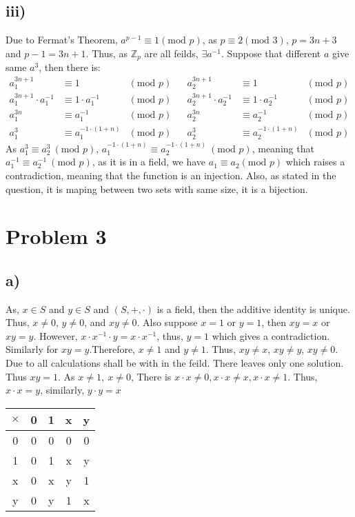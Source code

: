 \documentclass{article}
\begin{document}
\subsection*{iii)}
Due to Fermat's Theorem, \(a^{p-1}\equiv 1 (\text{mod }p)\), as \(p\equiv 2 (\text{mod }3)\), \(p=3n+3\) and \(p-1=3n+1\).
Thus, as \(\mathbb{Z}_p\) are all feilds, \(\exists a^{-1}\). Suppose that different \(a\) give same \(a^3\), then there is:
\begin{align*}
    a_1^{3n+1}&\equiv 1 &(\text{mod }p)&&a_2^{3n+1}&\equiv 1 &(\text{mod }p)\\
    a_1^{3n+1}\cdot a_1^{-1}&\equiv 1\cdot a_1^{-1} &(\text{mod }p)&&a_2^{3n+1}\cdot a_2^{-1}&\equiv 1\cdot a_2^{-1} &(\text{mod }p)\\
    a_1^{3n}&\equiv a_1^{-1} &(\text{mod }p)&&a_2^{3n}&\equiv a_2^{-1} &(\text{mod }p)\\
    a_1^{3}&\equiv a_1^{-1\cdot(1+n)} &(\text{mod }p)&&a_2^{3}&\equiv a_2^{-1\cdot(1+n)} &(\text{mod }p)
\end{align*}
As \(a^3_1\equiv a_2^3 \ (\text{mod }p)\), \(a_1^{-1\cdot(1+n)}\equiv a_2^{-1\cdot(1+n)}\ (\text{mod }p)\), meaning that
\\ \(a_1^{-1}\equiv a_2^{-1}\ (\text{mod }p)\), as it is in a field, we have \(a_1\equiv a_2 (\text{mod }p)\) which raises a contradiction, meaning that the 
function is an injection. Also, as stated in the question, it is maping between two sets with same size, it is a bijection.
\section*{Problem 3}
\subsection*{a)}
As, \(x\in S\) and \(y \in S\) and \((S,+,\cdot)\) is a field, then the additive identity is unique.
Thus, \(x\neq 0\), \(y\neq 0\), and \(xy\neq 0\). Also suppose \(x=1\) or \(y=1\), then \(xy=x\) or \(xy=y\).
However, \(x\cdot x^{-1}\cdot y = x\cdot x^{-1}\), thus, \(y=1\) which gives a contradiction. Similarly for \(xy=y\).Therefore, \(x\neq1\) and \(y\neq 1\).
Thus, \(xy\neq x\), \(xy\neq y\), \(xy\neq 0\). Due to all calculations shall be with in the feild. There leaves only one solution. Thus
\(xy = 1\). As \(x\neq1,\ x\neq 0\), There is \(x\cdot x \neq 0, x\cdot x \neq x, x\cdot x \neq 1\). Thus, \(x\cdot x = y\), similarly, \(y\cdot y = x\)

\begin{table*}[h]
    \centering
    \begin{tabular}{|c|c|c|c|c|}
        \hline
        \(\times\)&0&1&x&y\\ \hline
        0&0&0&0&0\\ \hline
        1&0&1&x&y\\ \hline
        x&0&x&y&1\\ \hline
        y&0&y&1&x\\ \hline
    \end{tabular}
\end{table*}
\newpage
\end{document}
